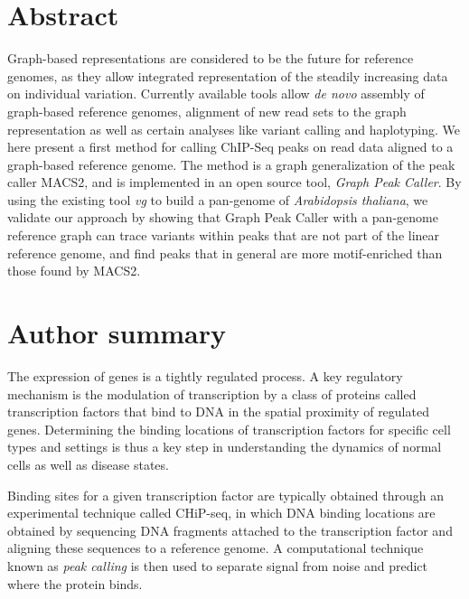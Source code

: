 \documentclass[10pt,letterpaper]{article}
\begin{document}
\section*{Abstract}

Graph-based representations are considered to be the future for reference genomes, as they allow integrated representation of the steadily increasing data on individual variation. Currently available tools allow \emph{de novo} assembly of  graph-based reference genomes, alignment of new read sets to the graph representation as well as certain analyses like variant calling and haplotyping. We here present a first method for calling ChIP-Seq peaks on read data aligned to a graph-based reference genome. The method is a graph generalization of the peak caller MACS2, and is implemented in an open source tool, \emph{Graph Peak Caller}. By using the existing tool \emph{vg} to build a pan-genome of \emph{Arabidopsis thaliana}, we validate our approach by showing that Graph Peak Caller with a pan-genome reference graph can trace variants within peaks that are not part of the linear reference genome, and find peaks that in general are more motif-enriched than those found by MACS2. 

\section*{Author summary}

The expression of genes is a tightly regulated process.
A key regulatory mechanism is the modulation of transcription by a class of proteins called transcription factors that bind to DNA in the spatial proximity of regulated genes.
Determining the binding locations of transcription factors for specific cell types and settings is thus a key step in understanding the dynamics of normal cells as well as disease states.

Binding sites for a given transcription factor are typically obtained through an experimental technique called CHiP-seq, in which DNA binding locations are obtained by sequencing DNA fragments attached to the transcription factor and aligning these sequences to a reference genome.
A computational technique known as \emph{peak calling} is then used to separate signal from noise and predict where the protein binds.
\end{document}
